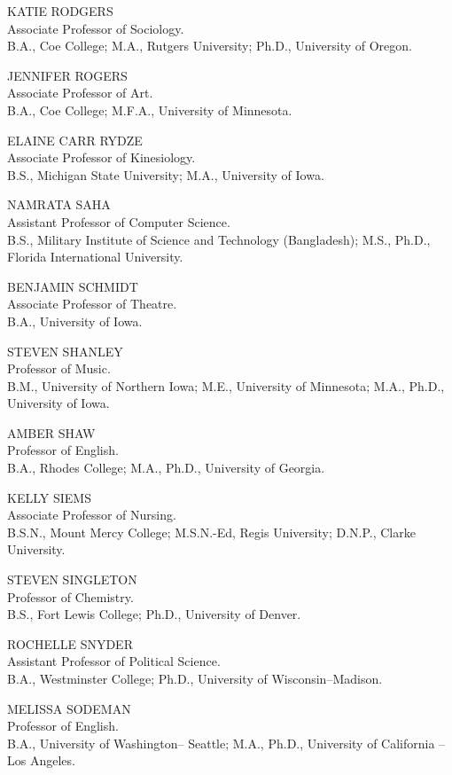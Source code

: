 \documentclass[
  letterpaper,
]{scrbook}
\begin{document}
KATIE RODGERS\\
Associate Professor of Sociology.\\
B.A., Coe College; M.A., Rutgers University; Ph.D., University of
Oregon.

JENNIFER ROGERS\\
Associate Professor of Art.\\
B.A., Coe College; M.F.A., University of Minnesota.

ELAINE CARR RYDZE\\
Associate Professor of Kinesiology.\\
B.S., Michigan State University; M.A., University of Iowa.

NAMRATA SAHA\\
Assistant Professor of Computer Science.\\
B.S., Military Institute of Science and Technology (Bangladesh); M.S.,
Ph.D., Florida International University.

BENJAMIN SCHMIDT\\
Associate Professor of Theatre.\\
B.A., University of Iowa.

STEVEN SHANLEY\\
Professor of Music.\\
B.M., University of Northern Iowa; M.E., University of Minnesota; M.A.,
Ph.D., University of Iowa.

AMBER SHAW\\
Professor of English.\\
B.A., Rhodes College; M.A., Ph.D., University of Georgia.

KELLY SIEMS\\
Associate Professor of Nursing.\\
B.S.N., Mount Mercy College; M.S.N.-Ed, Regis University; D.N.P., Clarke
University.

STEVEN SINGLETON\\
Professor of Chemistry.\\
B.S., Fort Lewis College; Ph.D., University of Denver.

ROCHELLE SNYDER\\
Assistant Professor of Political Science.\\
B.A., Westminster College; Ph.D., University of Wisconsin--Madison.

MELISSA SODEMAN\\
Professor of English.\\
B.A., University of Washington-- Seattle; M.A., Ph.D., University of
California -- Los Angeles.
\end{document}
